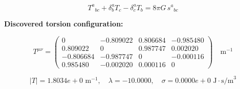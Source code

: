 
\begin{equation}
  T^a{}_{bc} + \delta^a_b T_c - \delta^a_c T_b = 8\pi G \, s^a{}_{bc}
\end{equation}

\textbf{Discovered torsion configuration:}

\begin{equation}
  T^{\mu\nu} = \begin{pmatrix}
    0 & -0.809022 & 0.806684 & -0.985480 \\
    0.809022 & 0 & 0.987747 & 0.002020 \\
    -0.806684 & -0.987747 & 0 & -0.000116 \\
    0.985480 & -0.002020 & 0.000116 & 0
  \end{pmatrix} \quad \text{m}^{-1}
\end{equation}

\begin{equation}
  |T| = 1.8034e+0 \text{ m}^{-1}, \quad
  \lambda = -10.0000, \quad
  \sigma = 0.0000e+0 \text{ J}\cdot\text{s/m}^3
\end{equation}